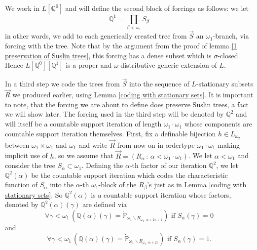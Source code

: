\documentclass[a4paper,11pt]{article}
\newcommand{\forceP}{\mathbb{P}}
\newcommand{\forceQ}{\mathbb{Q}}
\begin{document}
We work in $L[\forceQ^0]$ and will define the second block of forcings as follows: we let 
\[\forceQ^1= \prod_{\beta < \omega_1} S_{\beta} \]
in other words, we add to each generically created tree from $\vec{S}$ an $\omega_1$-branch, via forcing with the tree. Note that by the argument from the proof of lemma \ref{1 preservation of Suslin trees}, this forcing has a dense subset which is $\sigma$-closed. Hence $L[\forceQ^0][\forceQ^1]$ is a proper and $\omega$-distributive generic extension of $L$.

In a third step we code the trees from $\vec{S}$ into the sequence of $L$-stationary subsets $\vec{R}$ we produced earlier, using Lemma \ref{coding with stationary sets}. It is important to note, that the forcing we are about to define does preserve Suslin trees, a fact we will show later.
The forcing used in the third step will be denoted by $\mathbb{Q}^2$ and will itself be a countable support iteration of length $\omega_1 \cdot \omega_1$ whose components are countable support iteration themselves. First, fix a definable bijection $h \in L_{\omega_2}$ between $\omega_1 \times \omega_1$ and $\omega_1$ and write $\vec{R}$ from now on in ordertype $\omega_1 \cdot \omega_1$ making implicit use of $h$, so we assume that $\vec{R}= (R_{\alpha} \, : \, \alpha < \omega_1 \cdot \omega_1)$. We let $\alpha< \omega_1$ and consider the tree $S_{\alpha} \subset \omega_1$. Defining the $\alpha$-th factor of our iteration $\forceQ^2$, we let $\forceQ^2 (\alpha)$ be the countable support iteration which codes the characteristic function of $S_{\alpha}$ into the $\alpha$-th $\omega_1$-block of the $R_{\beta}$'s just as in Lemma \ref{coding with stationary sets}. So $\forceQ^2 (\alpha)$ is a countable support iteration whose factors, denoted by $\forceQ^2(\alpha) (\gamma)$ are defined via
\[ \forall \gamma < \omega_1 \,(\forceQ (\alpha) (\gamma)= \dot{\forceP}_{\omega_1 \backslash R_{\omega_1 \cdot \alpha + 2 \gamma +1}}) \text{ if } S_{\alpha} (\gamma) =0 \]
and
\[ \forall \gamma < \omega_1 \, (\forceQ( \alpha) (\gamma)= \dot{\forceP}_{\omega_1 \backslash R_{\omega_1 \cdot \alpha + 2 \gamma}}) \text{ if } S_{\alpha} (\gamma) =1. \]
\end{document}
